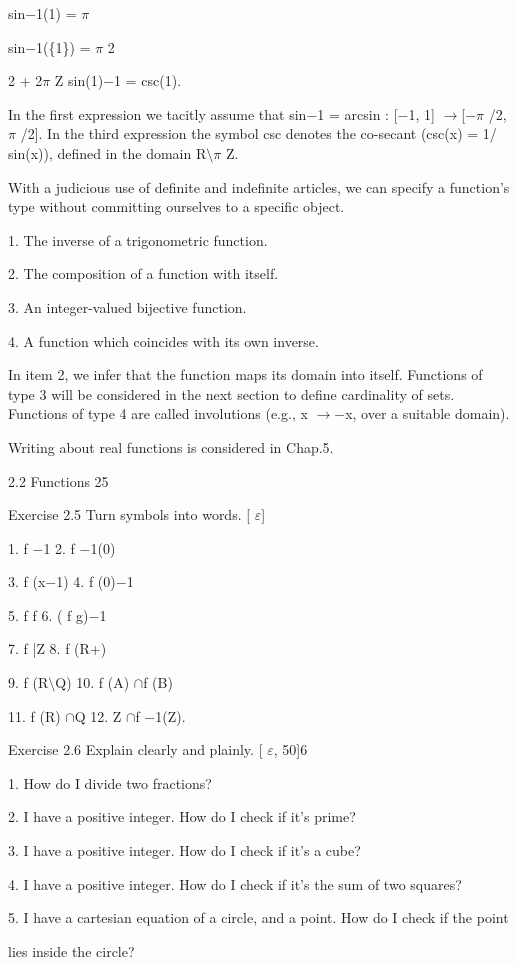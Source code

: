 \documentclass[11pt]{article}
\theoremstyle{plain}
\theoremstyle{definition}
\begin{document}
sin$-$1(1) = $\pi$

sin$-$1(\{1\}) = $\pi$ 2

2 + 2$\pi$ Z sin(1)$-$1 = csc(1).

In the first expression we tacitly assume that sin$-$1 = arcsin : [$-$1, 1] $\to$[$-$$\pi$ /2, $\pi$ /2]. In the third expression the symbol csc denotes the co-secant (csc(x) = 1/ sin(x)), defined in the domain R$\setminus$$\pi$ Z.

With a judicious use of definite and indefinite articles, we can specify a function's type without committing ourselves to a specific object.

1. The inverse of a trigonometric function.

2. The composition of a function with itself.

3. An integer-valued bijective function.

4. A function which coincides with its own inverse.

In item 2, we infer that the function maps its domain into itself. Functions of type 3 will be considered in the next section to define cardinality of sets. Functions of type 4 are called involutions (e.g., x $\to$$-$x, over a suitable domain).

Writing about real functions is considered in Chap.5.

2.2 Functions 25

Exercise 2.5 Turn symbols into words. [ $\varepsilon$]

1. f $-$1 2. f $-$1(0)

3. f (x$-$1) 4. f (0)$-$1

5. f f 6. ( f g)$-$1

7. f |Z 8. f (R+)

9. f (R$\setminus$Q) 10. f (A) $\cap$f (B)

11. f (R) $\cap$Q 12. Z $\cap$f $-$1(Z).

Exercise 2.6 Explain clearly and plainly. [ $\varepsilon$, 50]6

1. How do I divide two fractions?

2. I have a positive integer. How do I check if it's prime?

3. I have a positive integer. How do I check if it's a cube?

4. I have a positive integer. How do I check if it's the sum of two squares?

5. I have a cartesian equation of a circle, and a point. How do I check if the point

lies inside the circle?
\end{document}
